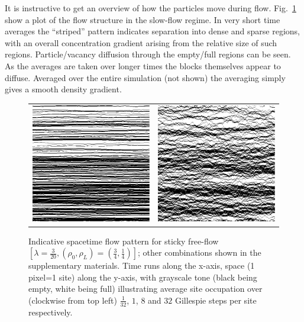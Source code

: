 \documentclass[
reprint, amsmath,amssymb,
]{revtex4-1}
\begin{document}
It is instructive to get an overview of how the particles move during
flow. Fig.~\ref{fig:flowPatterns} show a plot of the flow structure in
the slow-flow regime.  In very short time averages the ``striped''
pattern indicates separation into dense and sparse regions, with an
overall concentration gradient arising from the relative size of such
regions.  Particle/vacancy diffusion through the empty/full regions
can be seen.  As the averages are taken over longer times the blocks themselves appear to diffuse.  Averaged over the entire simulation (not shown) the averaging simply gives a smooth density gradient.

\begin{figure}[h!]
\caption{\label{fig:flowPatterns} 
Indicative spacetime flow pattern for sticky free-flow $\left[\lambda = \frac{3}{20}, (\rho_0, \rho_L) = (\frac{3}{4}, \frac{1}{4})\right]$; other combinations shown in the supplementary materials.
Time runs along the x-axis, space (1 pixel=1 site) along the y-axis, with grayscale tone (black being empty, white being full) illustrating average site occupation over (clockwise from top left) $\frac{1}{32}$, $1$, $8$ and $32$ Gillespie steps per site respectively.}
\begin{center}
 \begin{tabular}{c | c}
    \includegraphics[width=0.49\linewidth]{shortTime}  &\includegraphics[width=0.49\linewidth]{midShortTime} \\

\end{tabular}
\end{center}
\end{figure}
\end{document}
